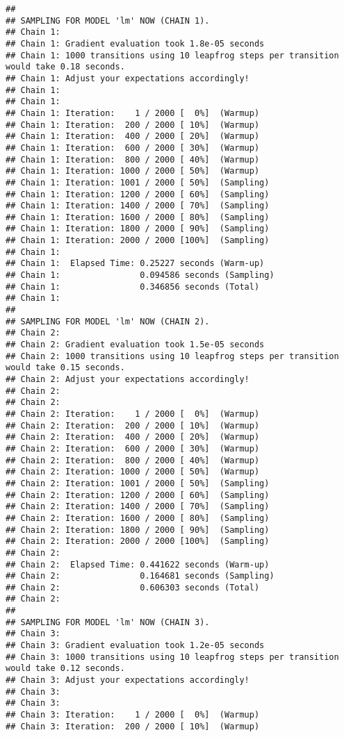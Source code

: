 \documentclass[
]{article}
\begin{document}
\begin{verbatim}
## 
## SAMPLING FOR MODEL 'lm' NOW (CHAIN 1).
## Chain 1: 
## Chain 1: Gradient evaluation took 1.8e-05 seconds
## Chain 1: 1000 transitions using 10 leapfrog steps per transition would take 0.18 seconds.
## Chain 1: Adjust your expectations accordingly!
## Chain 1: 
## Chain 1: 
## Chain 1: Iteration:    1 / 2000 [  0%]  (Warmup)
## Chain 1: Iteration:  200 / 2000 [ 10%]  (Warmup)
## Chain 1: Iteration:  400 / 2000 [ 20%]  (Warmup)
## Chain 1: Iteration:  600 / 2000 [ 30%]  (Warmup)
## Chain 1: Iteration:  800 / 2000 [ 40%]  (Warmup)
## Chain 1: Iteration: 1000 / 2000 [ 50%]  (Warmup)
## Chain 1: Iteration: 1001 / 2000 [ 50%]  (Sampling)
## Chain 1: Iteration: 1200 / 2000 [ 60%]  (Sampling)
## Chain 1: Iteration: 1400 / 2000 [ 70%]  (Sampling)
## Chain 1: Iteration: 1600 / 2000 [ 80%]  (Sampling)
## Chain 1: Iteration: 1800 / 2000 [ 90%]  (Sampling)
## Chain 1: Iteration: 2000 / 2000 [100%]  (Sampling)
## Chain 1: 
## Chain 1:  Elapsed Time: 0.25227 seconds (Warm-up)
## Chain 1:                0.094586 seconds (Sampling)
## Chain 1:                0.346856 seconds (Total)
## Chain 1: 
## 
## SAMPLING FOR MODEL 'lm' NOW (CHAIN 2).
## Chain 2: 
## Chain 2: Gradient evaluation took 1.5e-05 seconds
## Chain 2: 1000 transitions using 10 leapfrog steps per transition would take 0.15 seconds.
## Chain 2: Adjust your expectations accordingly!
## Chain 2: 
## Chain 2: 
## Chain 2: Iteration:    1 / 2000 [  0%]  (Warmup)
## Chain 2: Iteration:  200 / 2000 [ 10%]  (Warmup)
## Chain 2: Iteration:  400 / 2000 [ 20%]  (Warmup)
## Chain 2: Iteration:  600 / 2000 [ 30%]  (Warmup)
## Chain 2: Iteration:  800 / 2000 [ 40%]  (Warmup)
## Chain 2: Iteration: 1000 / 2000 [ 50%]  (Warmup)
## Chain 2: Iteration: 1001 / 2000 [ 50%]  (Sampling)
## Chain 2: Iteration: 1200 / 2000 [ 60%]  (Sampling)
## Chain 2: Iteration: 1400 / 2000 [ 70%]  (Sampling)
## Chain 2: Iteration: 1600 / 2000 [ 80%]  (Sampling)
## Chain 2: Iteration: 1800 / 2000 [ 90%]  (Sampling)
## Chain 2: Iteration: 2000 / 2000 [100%]  (Sampling)
## Chain 2: 
## Chain 2:  Elapsed Time: 0.441622 seconds (Warm-up)
## Chain 2:                0.164681 seconds (Sampling)
## Chain 2:                0.606303 seconds (Total)
## Chain 2: 
## 
## SAMPLING FOR MODEL 'lm' NOW (CHAIN 3).
## Chain 3: 
## Chain 3: Gradient evaluation took 1.2e-05 seconds
## Chain 3: 1000 transitions using 10 leapfrog steps per transition would take 0.12 seconds.
## Chain 3: Adjust your expectations accordingly!
## Chain 3: 
## Chain 3: 
## Chain 3: Iteration:    1 / 2000 [  0%]  (Warmup)
## Chain 3: Iteration:  200 / 2000 [ 10%]  (Warmup)

\end{verbatim}
\end{document}
